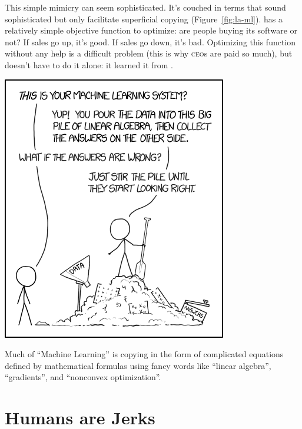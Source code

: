 This simple mimicry can seem sophisticated.  It's couched in terms
that sound sophisticated but only facilitate superficial copying
(Figure~\ref{fig:la-ml}).  \energyCompany{} has a relatively simple
objective function to optimize: are people buying its
software or not?  If sales go up, it's good.  If sales go down, it's
bad.  Optimizing this function without any help is a difficult problem
(this is why \textsc{ceo}s are paid so much), but \energyCompany{}
doesn't have to do it alone: it learned it from \energyJerk{}.

\begin{marginfigure}%
  \includegraphics[width=\linewidth]{figures/xkcd-la-ml}
  \caption{Much of ``Machine Learning'' is copying in the form of
    complicated equations defined by mathematical formulas using fancy
    words like ``linear algebra'', ``gradients'', and ``nonconvex optimization''.}
  \label{fig:la-ml}
\end{marginfigure}

\section{Humans are Jerks}

